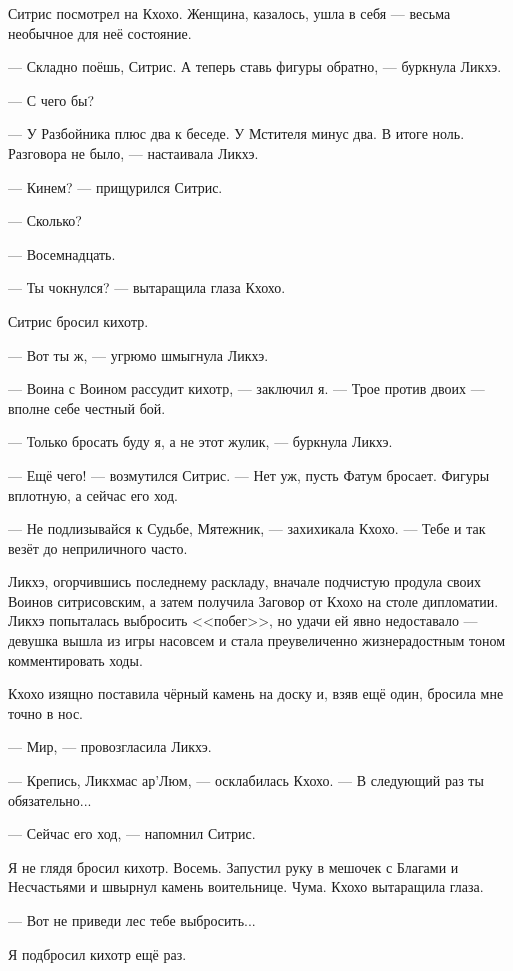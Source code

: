 Ситрис посмотрел на Кхохо.
Женщина, казалось, ушла в себя --- весьма необычное для неё состояние.

--- Складно поёшь, Ситрис.
А теперь ставь фигуры обратно, --- буркнула Ликхэ.

--- С чего бы?

--- У Разбойника плюс два к беседе.
У Мстителя минус два.
В итоге ноль.
Разговора не было, --- настаивала Ликхэ.

--- Кинем? --- прищурился Ситрис.

--- Сколько?

--- Восемнадцать.

--- Ты чокнулся? --- вытаращила глаза Кхохо.

Ситрис бросил кихотр.

--- Вот ты ж, --- угрюмо шмыгнула Ликхэ.

--- Воина с Воином рассудит кихотр, --- заключил я.
--- Трое против двоих --- вполне себе честный бой.

--- Только бросать буду я, а не этот жулик, --- буркнула Ликхэ.

--- Ещё чего! --- возмутился Ситрис.
--- Нет уж, пусть Фатум бросает.
Фигуры вплотную, а сейчас его ход.

--- Не подлизывайся к Судьбе, Мятежник, --- захихикала Кхохо.
--- Тебе и так везёт до неприличного часто.

\textspace

Ликхэ, огорчившись последнему раскладу, вначале подчистую продула своих Воинов ситрисовским, а затем получила Заговор от Кхохо на столе дипломатии.
Ликхэ попыталась выбросить <<побег>>, но удачи ей явно недоставало --- девушка вышла из игры насовсем и стала преувеличенно жизнерадостным тоном комментировать ходы.

\textspace

Кхохо изящно поставила чёрный камень на доску и, взяв ещё один, бросила мне точно в нос.

--- Мир, --- провозгласила Ликхэ.

--- Крепись, Ликхмас ар’Люм, --- осклабилась Кхохо.
--- В следующий раз ты обязательно...

--- Сейчас его ход, --- напомнил Ситрис.

Я не глядя бросил кихотр.
Восемь.
Запустил руку в мешочек с Благами и Несчастьями и швырнул камень воительнице.
Чума.
Кхохо вытаращила глаза.

--- Вот не приведи лес тебе выбросить...

Я подбросил кихотр ещё раз.

